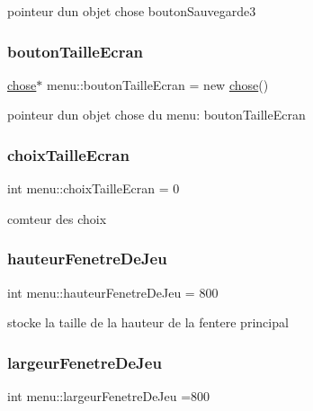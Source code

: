 pointeur d\textquotesingle{}un objet chose bouton\+Sauvegarde3 \mbox{\label{classmenu_aee8418eb26372ba7964d0bd8a6c20cf8}} 
\subsubsection{\texorpdfstring{bouton\+Taille\+Ecran}{boutonTailleEcran}}
{\footnotesize\ttfamily \mbox{\hyperlink{classchose}{chose}}$\ast$ menu\+::bouton\+Taille\+Ecran = new \mbox{\hyperlink{classchose}{chose}}()}

pointeur d\textquotesingle{}un objet chose du menu\+: bouton\+Taille\+Ecran \mbox{\label{classmenu_abe50013aa2c10b0fc2afb5e8d6e7ae85}} 
\subsubsection{\texorpdfstring{choix\+Taille\+Ecran}{choixTailleEcran}}
{\footnotesize\ttfamily int menu\+::choix\+Taille\+Ecran = 0}

comteur des choix \mbox{\label{classmenu_ac872a1f3dae51cbf6867bc6d68f7942a}} 
\subsubsection{\texorpdfstring{hauteur\+Fenetre\+De\+Jeu}{hauteurFenetreDeJeu}}
{\footnotesize\ttfamily int menu\+::hauteur\+Fenetre\+De\+Jeu = 800}

stocke la taille de la hauteur de la fentere principal \mbox{\label{classmenu_a8d48c6df67669851f7d0d7420c859712}} 
\subsubsection{\texorpdfstring{largeur\+Fenetre\+De\+Jeu}{largeurFenetreDeJeu}}
{\footnotesize\ttfamily int menu\+::largeur\+Fenetre\+De\+Jeu =800}


